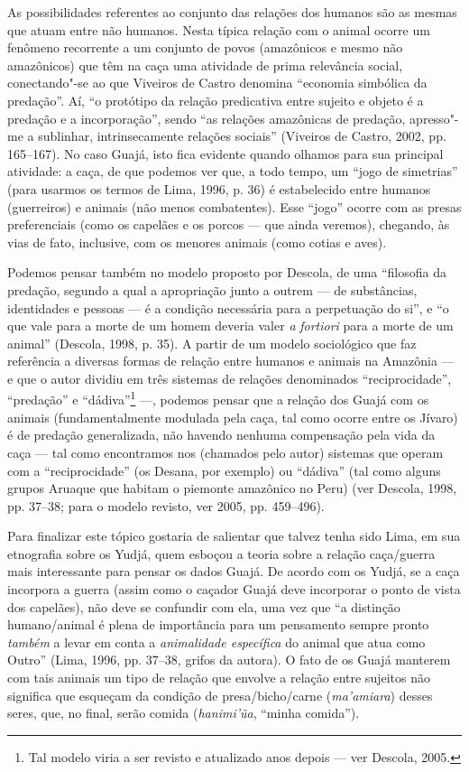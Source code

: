 As possibilidades referentes ao conjunto das relações dos humanos são as
mesmas que atuam entre não humanos. Nesta típica relação com o animal
ocorre um fenômeno recorrente a um conjunto de povos (amazônicos e mesmo
não amazônicos) que têm na caça uma atividade de prima relevância
social, conectando"-se ao que Viveiros de Castro denomina ``economia
simbólica da predação''. Aí, ``o protótipo da relação predicativa entre
sujeito e objeto é a predação e a incorporação'', sendo ``as relações
amazônicas de predação, apresso"-me a sublinhar, intrinsecamente relações
sociais'' (Viveiros de Castro, 2002, pp. 165--167). No caso Guajá, isto
fica evidente quando olhamos para sua principal atividade: a caça, de
que podemos ver que, a todo tempo, um ``jogo de simetrias'' (para usarmos
os termos de Lima, 1996, p. 36) é estabelecido entre humanos
(guerreiros) e animais (não menos combatentes). Esse ``jogo'' ocorre com
as presas preferenciais (como os capelães e os porcos --- que ainda
veremos), chegando, às vias de fato, inclusive, com os menores animais
(como cotias e aves).

Podemos pensar também no modelo proposto por Descola, de uma ``filosofia
da predação, segundo a qual a apropriação junto a outrem --- de
substâncias, identidades e pessoas --- é a condição necessária para a
perpetuação do si'', e ``o que vale para a morte de um homem deveria valer
\emph{a} \emph{fortiori} para a morte de um animal'' (Descola, 1998, p.
35). A partir de um modelo sociológico que faz referência a diversas
formas de relação entre humanos e animais na Amazônia --- e que o autor
dividiu em três sistemas de relações denominados ``reciprocidade'',
``predação'' e ``dádiva''\footnote{Tal modelo viria a ser revisto e
  atualizado anos depois --- ver Descola, 2005.} ---, podemos pensar que a
relação dos Guajá com os animais (fundamentalmente modulada pela caça,
tal como ocorre entre os Jívaro) é de predação generalizada, não havendo
nenhuma compensação pela vida da caça --- tal como encontramos nos
(chamados pelo autor) sistemas que operam com a ``reciprocidade'' (os
Desana, por exemplo) ou ``dádiva'' (tal como alguns grupos Aruaque que
habitam o piemonte amazônico no Peru) (ver Descola, 1998, pp. 37--38;
para o modelo revisto, ver 2005, pp. 459--496).

Para finalizar este tópico gostaria de salientar que talvez tenha sido
Lima, em sua etnografia sobre os Yudjá, quem esboçou a teoria sobre a
relação caça/guerra mais interessante para pensar os dados Guajá. De
acordo com os Yudjá, se a caça incorpora a guerra (assim como o caçador
Guajá deve incorporar o ponto de vista dos capelães), não deve se
confundir com ela, uma vez que ``a distinção humano/animal é plena de
importância para um pensamento sempre pronto \emph{também} a levar em
conta a \emph{animalidade específica} do animal que atua como Outro''
(Lima, 1996, pp. 37--38, grifos da autora). O fato de os Guajá manterem
com tais animais um tipo de relação que envolve a relação entre sujeitos
não significa que esqueçam da condição de presa/bicho/carne
(\emph{ma'amiara}) desses seres, que, no final, serão comida
(\emph{hanimi'ũa}, ``minha comida'').

